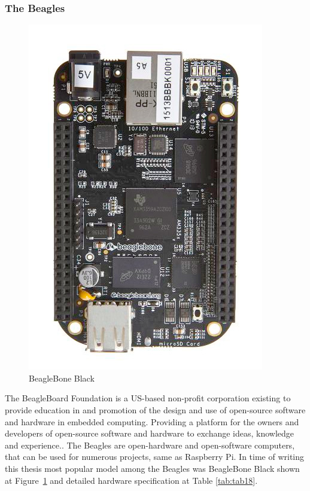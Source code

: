 \subsubsection{The Beagles} %
\label{ssub:the_beagles}
\begin{figure}[H]
\begin{center}
\captionsetup{font=small}
\includegraphics[scale=0.4]{pics/beagle.jpg}
\caption{BeagleBone Black\cite{beagle_pic}}
\label{fig:ch4}
\end{center}
\end{figure}
The BeagleBoard Foundation is a US-based non-profit corporation existing to provide education in and promotion of the design and use of open-source software and hardware in embedded computing. Providing a platform for the owners and developers of open-source software and hardware to exchange ideas, knowledge and experience.\cite{beagle_what}. The Beagles are open-hardware and open-software computers, that can be used for numerous projects, same as Raspberry Pi. In time of writing this thesis most popular model among the Beagles was BeagleBone Black shown at Figure~\ref{fig:ch4} and detailed hardware specification at Table \ref{tab:tab18}.
